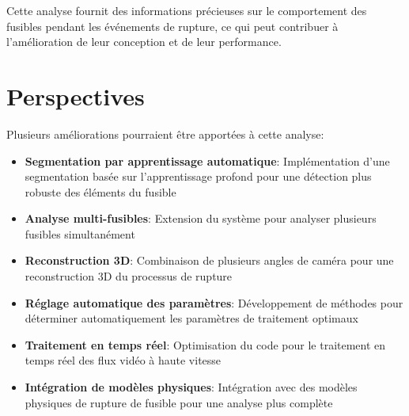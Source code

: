 \documentclass[12pt,a4paper]{article}
\begin{document}
Cette analyse fournit des informations précieuses sur le comportement des fusibles pendant les événements de rupture, ce qui peut contribuer à l'amélioration de leur conception et de leur performance.

\section{Perspectives}

Plusieurs améliorations pourraient être apportées à cette analyse:

\begin{itemize}
    \item \textbf{Segmentation par apprentissage automatique}: Implémentation d'une segmentation basée sur l'apprentissage profond pour une détection plus robuste des éléments du fusible
    
    \item \textbf{Analyse multi-fusibles}: Extension du système pour analyser plusieurs fusibles simultanément
    
    \item \textbf{Reconstruction 3D}: Combinaison de plusieurs angles de caméra pour une reconstruction 3D du processus de rupture
    
    \item \textbf{Réglage automatique des paramètres}: Développement de méthodes pour déterminer automatiquement les paramètres de traitement optimaux
    
    \item \textbf{Traitement en temps réel}: Optimisation du code pour le traitement en temps réel des flux vidéo à haute vitesse
    
    \item \textbf{Intégration de modèles physiques}: Intégration avec des modèles physiques de rupture de fusible pour une analyse plus complète
\end{itemize}
\end{document}
